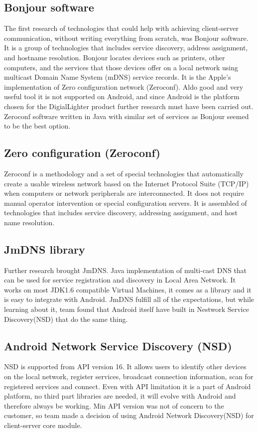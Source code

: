 \subsection{Bonjour software}
The first research of technologies that could help with achieving client-server communication, without writing everything from scratch, was Bonjour software. 
It is a group of technologies that includes service discovery, address assignment, and hostname resolution. 
Bonjour locates devices such as printers, other computers, and the services that those devices offer on a local network using multicast Domain Name System (mDNS) service records.
It is the Apple's implementation of Zero configuration network (Zeroconf).
Aldo good and very useful tool it is not supported on Android, and since Android is the platform chosen for the DigialLighter product further research must have been carried out. 
Zeroconf software written in Java with similar set of services as Bonjour seemed to be the best option.

\subsection {Zero configuration (Zeroconf)}
Zeroconf is a methodology and a set of special technologies that automatically create a usable wireless network based on the Internet Protocol Suite (TCP/IP) when computers or network peripherals are interconnected. 
It does not require manual operator intervention or special configuration servers.
It is assembled of technologies that includes service discovery, addressing assignment, and host name resolution.


\subsection{JmDNS library}
Further research brought JmDNS. 
Java implementation of multi-cast DNS that can be used for service registration and discovery in Local Area Network. 
It works on most JDK1.6 compatible Virtual Machines, it comes as a library and it is easy to integrate with Android. 
JmDNS fulfill all of the expectations, but while learning about it, team found that Android itself have built in Nestwork Service Discovery(NSD) that do the same thing.

\subsection{Android Network Service Discovery (NSD)}
NSD is supported from API version 16. 
It allows users to identify other devices on the local network, register services, broadcast connection information, scan for registered services and connect.
Even with API limitation it is a part of Android platform, no third part libraries are needed, it will evolve with Android and therefore always be working.
Min API version was not of concern to the customer, so team made a decision of using Android Network Discovery(NSD) for client-server core module.

